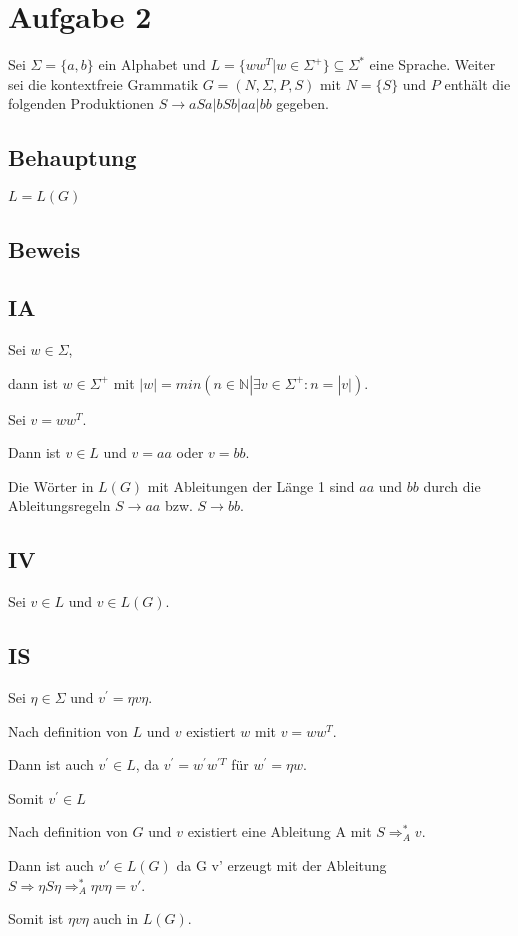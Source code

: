 \section*{Aufgabe 2}

Sei $\Sigma = \{ a, b \}$ ein Alphabet und $L =\{ww^T|w \in \Sigma^+\}\subseteq \Sigma^*$
eine Sprache. Weiter sei die kontextfreie
Grammatik $G = (N, \Sigma, P, S)$ mit $N = \{ S \}$ und $P$ enthält die folgenden Produktionen
$S → aSa | bSb | aa | bb$
gegeben.

\subsection*{Behauptung}

$L = L(G)$

\subsection*{Beweis}

\subsection*{IA}
	
	Sei $w \in \Sigma$,
	
	dann ist $w \in \Sigma^+$ mit $|w| = min(n\in\mathbb{N}| \exists v \in \Sigma^+ : n = |v|)$.
	
	Sei $v = ww^T$.

	Dann ist $v \in L$ und $v = aa$ oder $v = bb$.
	
	Die Wörter in $L(G)$ mit Ableitungen der Länge 1 sind $aa$ und $bb$
	durch die Ableitungsregeln $S \to aa$ bzw. $S \to bb$.
				
\subsection*{IV}
	Sei $v \in L$ und $v \in L(G)$.
	
\subsection*{IS}

	Sei $\eta \in \Sigma$ und $v^\prime = \eta v\eta$.
	
	Nach definition von $L$ und $v$ existiert $w$ mit $v = ww^T$.
	
	Dann ist auch $v^\prime \in L$, da $v^\prime = w^\prime w^{\prime T}$ für $w^\prime = \eta w$.

	Somit $v^\prime \in L$
		
	Nach definition von $G$ und $v$ existiert eine Ableitung A mit $S \Rightarrow^*_A v$.	
	
	Dann ist auch $v' \in L(G)$ da G v' erzeugt mit der Ableitung $S \Rightarrow \eta S\eta \Rightarrow^*_A \eta v\eta = v'$.
	
	Somit ist $\eta v\eta $ auch in $L(G)$.